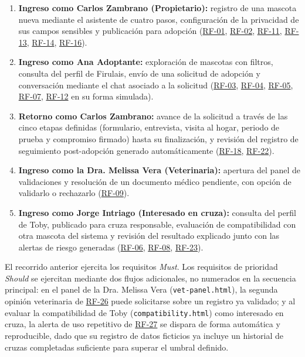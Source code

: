 \documentclass[journal,onecolumn]{IEEEtran}
\begin{document}
	\begin{enumerate}[leftmargin=*]
		\item \textbf{Ingreso como Carlos Zambrano (Propietario):} registro de
		una mascota nueva mediante el asistente de cuatro pasos, configuración
		de la privacidad de sus campos sensibles y publicación para adopción
		(\hyperref[tab:RF-01]{RF-01}, \hyperref[tab:RF-02]{RF-02}, \hyperref[tab:RF-11]{RF-11}, \hyperref[tab:RF-13]{RF-13}, \hyperref[tab:RF-14]{RF-14}, \hyperref[tab:RF-16]{RF-16}).
		\item \textbf{Ingreso como Ana Adoptante:} exploración de mascotas con
		filtros, consulta del perfil de Firulais, envío de una solicitud de
		adopción y conversación mediante el chat asociado a la solicitud
		(\hyperref[tab:RF-03]{RF-03}, \hyperref[tab:RF-04]{RF-04}, \hyperref[tab:RF-05]{RF-05}, \hyperref[tab:RF-07]{RF-07}, \hyperref[tab:RF-12]{RF-12} en su forma simulada).
		\item \textbf{Retorno como Carlos Zambrano:} avance de la solicitud a
		través de las cinco etapas definidas (formulario, entrevista, visita al
		hogar, periodo de prueba y compromiso firmado) hasta su finalización, y
		revisión del registro de seguimiento post-adopción generado
		automáticamente (\hyperref[tab:RF-18]{RF-18}, \hyperref[tab:RF-22]{RF-22}).
		\item \textbf{Ingreso como la Dra. Melissa Vera (Veterinaria):}
		apertura del panel de validaciones y resolución de un documento médico
		pendiente, con opción de validarlo o rechazarlo (\hyperref[tab:RF-09]{RF-09}).
		\item \textbf{Ingreso como Jorge Intriago (Interesado en cruza):}
		consulta del perfil de Toby, publicado para cruza responsable,
		evaluación de compatibilidad con otra mascota del sistema y revisión
		del resultado explicado junto con las alertas de riesgo generadas
		(\hyperref[tab:RF-06]{RF-06}, \hyperref[tab:RF-08]{RF-08}, \hyperref[tab:RF-23]{RF-23}).
	\end{enumerate}
	
	El recorrido anterior ejercita los requisitos \emph{Must}. Los requisitos
	de prioridad \emph{Should} se ejercitan mediante dos flujos adicionales,
	no numerados en la secuencia principal: en el panel de
	la Dra. Melissa Vera (\texttt{vet-panel.html}), la segunda opinión
	veterinaria de \hyperref[tab:RF-26]{RF-26} puede solicitarse sobre un registro ya validado; y al
	evaluar la compatibilidad de Toby (\texttt{compatibility.html}) como
	interesado en cruza, la alerta de uso repetitivo de \hyperref[tab:RF-27]{RF-27} se dispara de
	forma automática y reproducible, dado que su registro de datos ficticios
	ya incluye un historial de cruzas completadas suficiente para superar el
	umbral definido.
	
\end{document}
